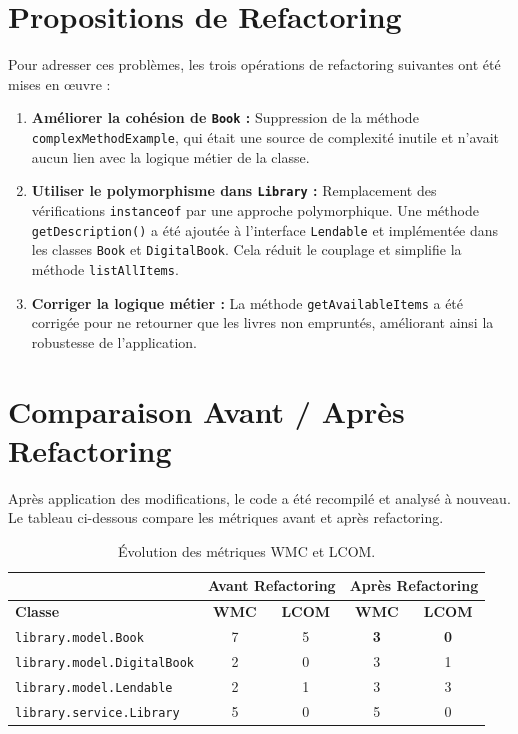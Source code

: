 \documentclass[11pt, a4paper]{article}
\begin{document}
\section{Propositions de Refactoring}
Pour adresser ces problèmes, les trois opérations de refactoring suivantes ont été mises en œuvre :
\begin{enumerate}
    \item \textbf{Améliorer la cohésion de \texttt{Book} :} Suppression de la méthode \texttt{complexMethodExample}, qui était une source de complexité inutile et n'avait aucun lien avec la logique métier de la classe.
    \item \textbf{Utiliser le polymorphisme dans \texttt{Library} :} Remplacement des vérifications \texttt{instanceof} par une approche polymorphique. Une méthode \texttt{getDescription()} a été ajoutée à l'interface \texttt{Lendable} et implémentée dans les classes \texttt{Book} et \texttt{DigitalBook}. Cela réduit le couplage et simplifie la méthode \texttt{listAllItems}.
    \item \textbf{Corriger la logique métier :} La méthode \texttt{getAvailableItems} a été corrigée pour ne retourner que les livres non empruntés, améliorant ainsi la robustesse de l'application.
\end{enumerate}

\section{Comparaison Avant / Après Refactoring}
Après application des modifications, le code a été recompilé et analysé à nouveau. Le tableau ci-dessous compare les métriques avant et après refactoring.

\begin{table}[h!]
\centering
\begin{tabular}{|l|c|c|c|c|}
\hline
 & \multicolumn{2}{c|}{\textbf{Avant Refactoring}} & \multicolumn{2}{c|}{\textbf{Après Refactoring}} \\
\hline
\textbf{Classe} & \textbf{WMC} & \textbf{LCOM} & \textbf{WMC} & \textbf{LCOM} \\
\hline
\texttt{library.model.Book} & 7 & 5 & \textbf{3} & \textbf{0} \\
\hline
\texttt{library.model.DigitalBook} & 2 & 0 & 3 & 1 \\
\hline
\texttt{library.model.Lendable} & 2 & 1 & 3 & 3 \\
\hline
\texttt{library.service.Library} & 5 & 0 & 5 & 0 \\
\hline
\end{tabular}
\caption{Évolution des métriques WMC et LCOM.}
\label{tab:metrics_compare}
\end{table}
\end{document}
